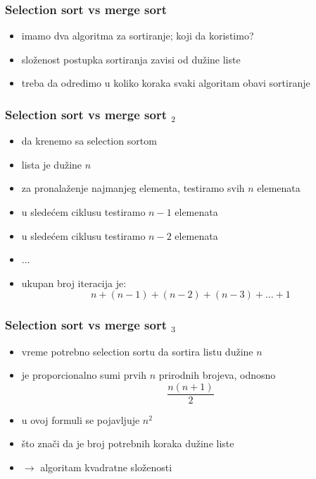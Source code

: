 \documentclass[utf8,compress,aspectratio=169]{beamer}
\begin{document}
\begin{frame}[fragile]
  \frametitle{Selection sort vs merge sort}
  \begin{itemize}
    \item imamo dva algoritma za sortiranje; koji da koristimo?
    \item složenost postupka sortiranja zavisi od dužine liste
    \item treba da odredimo u koliko koraka svaki algoritam obavi sortiranje
  \end{itemize}
\end{frame}

\begin{frame}[fragile]
  \frametitle{Selection sort vs merge sort $_2$}
  \begin{itemize}
    \item da krenemo sa selection sortom
    \item lista je dužine $n$
    \item za pronalaženje najmanjeg elementa, testiramo svih $n$ elemenata
    \item u sledećem ciklusu testiramo $n-1$ elemenata
    \item u sledećem ciklusu testiramo $n-2$ elemenata
    \item ...
    \item ukupan broj iteracija je: \\
      $$ n + (n-1) + (n-2) + (n-3) + \ldots + 1 $$
  \end{itemize}
\end{frame}

\begin{frame}[fragile]
  \frametitle{Selection sort vs merge sort $_3$}
  \begin{itemize}
    \item vreme potrebno selection sortu da sortira listu dužine $n$
    \item je proporcionalno sumi prvih $n$ prirodnih brojeva, odnosno \\
      $$ \frac{n(n+1)}{2} $$
    \item u ovoj formuli se pojavljuje $n^2$
    \item što znači da je broj potrebnih koraka  dužine liste
    \item $\rightarrow$ algoritam kvadratne složenosti
  \end{itemize}
\end{frame}
\end{document}
